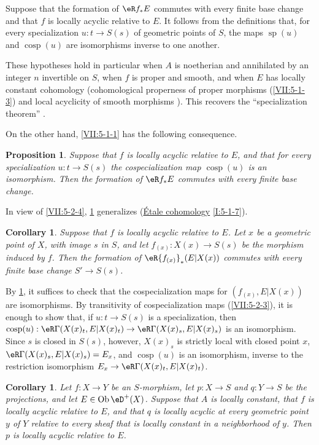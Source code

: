\documentclass[12pt,oneside,english]{smfbook}
\DeclareMathOperator{\cosp}{cosp}
\DeclareMathOperator{\ob}{Ob}
\DeclareMathOperator{\spe}{sp} %
\newtheorem{proposition}[subsubsection]{Proposition}
\newtheorem{corollary}[subsubsection]{Corollary}
\begin{document}
Suppose that the formation of $\eR f_\ast E$ commutes with every finite base change and that $f$ is locally acyclic relative to $E$. It follows from the definitions that, for every specialization $u:t\to S(s)$ of geometric points of $S$, the maps $\spe(u)$ and $\cosp(u)$ are isomorphisms inverse to one another.

These hypotheses hold in particular when $A$ is noetherian and annihilated by an integer $n$ invertible on $S$, when $f$ is proper and smooth, and when $E$ has locally constant cohomology (cohomological properness of proper morphisms (\ref{VII:5-1-3}) and local acyclicity of smooth morphisms \cite[XV]{sga4}). This recovers the ``specialization theorem'' \cite[XVI 2.1]{sga4}.

On the other hand, \ref{VII:5-1-1} has the following consequence.

\begin{proposition}\label{VII:5-2-5}
Suppose that $f$ is locally acyclic relative to $E$, and that for every specialization $u:t\to S(s)$ the cospecialization map $\cosp(u)$ is an isomorphism. Then the formation of $\eR f_\ast E$ commutes with every finite base change.
\end{proposition}

In view of \ref{VII:5-2-4}, \ref{VII:5-2-5} generalizes (\hyperref[I]{Étale cohomology} \ref{I:5-1-7}).

\begin{corollary}\label{VII:5-2-6}
Suppose that $f$ is locally acyclic relative to $E$. Let $x$ be a geometric point of $X$, with image $s$ in $S$, and let $f_{(x)}:X(x)\to S(s)$ be the morphism induced by $f$. Then the formation of $\eR {f_{(x)}}_\ast(E|X(x))$ commutes with every finite base change $S'\to S(s)$.
\end{corollary}

By \ref{VII:5-2-5}, it suffices to check that the cospecialization maps for $(f_{(x)},E|X(x))$ are isomorphisms. By transitivity of cospecialization maps (\ref{VII:5-2-3}), it is enough to show that, if $u:t\to S(s)$ is a specialization, then $\cosp(u):\eR\Gamma(X(x)_t,E|X(x)_t)\to \eR\Gamma(X(x)_s,E|X(x)_s)$ is an isomorphism. Since $s$ is closed in $S(s)$, however, $X(x)_s$ is strictly local with closed point $x$, $\eR\Gamma(X(x)_s,E|X(x)_s)=E_x$, and $\cosp(u)$ is an isomorphism, inverse to the restriction isomorphism $E_x\to \eR\Gamma(X(x)_t,E|X(x)_t)$.

\begin{corollary}\label{VII:5-2-7}
Let $f:X\to Y$ be an $S$-morphism, let $p:X\to S$ and $q:Y\to S$ be the projections, and let $E\in\ob\eD^+(X)$. Suppose that $A$ is locally constant, that $f$ is locally acyclic relative to $E$, and that $q$ is locally acyclic at every geometric point $y$ of $Y$ relative to every sheaf that is locally constant in a neighborhood of $y$. Then $p$ is locally acyclic relative to $E$.
\end{corollary}
\end{document}
